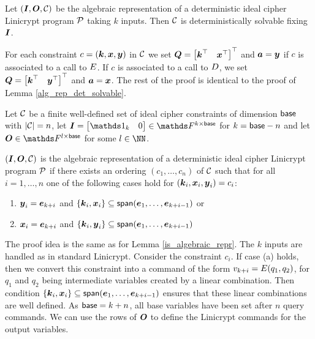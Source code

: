 \begin{lemma}
\label{alg_rep_det_solvable_ic}
    Let $(\I, \O, \C)$ be the algebraic representation of a deterministic ideal cipher Linicrypt program $\P$ taking $k$ inputs.
    Then $\C$ is deterministically solvable fixing $\I$.
\end{lemma}

\begin{sketch}
    For each constraint $c = (\vk, \vx, \vy)$ in $\C$ we set $\Q = \m{\vk^\top & \vx^\top}^\top$ and $\va = \vy$ if $c$ is associated to a call to $\E$.
    If $c$ is associated to a call to $\D$,
    we set $\Q = \m{\vk^\top & \vy^\top}^\top$ and $\va = \vx$.
    The rest of the proof is identical to the proof of Lemma \ref{alg_rep_det_solvable}.
\end{sketch}

\begin{lemma}
\label{is_algebraic_repr_ic}
    Let $\C$ be a finite well-defined set of ideal cipher constraints of dimension $\base$ with $|\C| = n$,
    let $\I = \m{\Id_k & 0} \in \F^{k\times\base}$ for $k = \base - n$
    and let $\O \in \F^{l \times \base}$ for some $l \in \NN$.
       
    $(\I, \O, \C)$ is the algebraic representation of a deterministic ideal cipher Linicrypt program $\P$
    if there exists an ordering $(c_1, \dots, c_n)$ of $\C$
    such that for all $i=1, \dots, n$ one of the following cases hold for $(\vk_i, \vx_i, \vy_i) = c_i$:
    \begin{enumerate}[label=(\alph*)]
    \item
    $\vy_i = \ve_{k+i}$ and $\{\vk_i, \vx_i\} \subseteq \spn(\dts \ve {k+i-1})$ or
    \item
    $\vx_i = \ve_{k+i}$ and $\{\vk_i, \vy_i\} \subseteq \spn(\dts \ve {k+i-1})$
    \end{enumerate}
\end{lemma}

\begin{sketch}
    The proof idea is the same as for Lemma \ref{is_algebraic_repr}.
    The $k$ inputs are handled as in standard Linicrypt.
    Consider the constraint $c_i$.
    If case (a) holds, then we convert this constraint into a command of the form $v_{k+i} = \E(q_1, q_2)$,
    for $q_1$ and $q_2$ being intermediate variables created by a linear combination.
    Then condition $\{\vk_i, \vx_i\} \subseteq \spn(\dts \ve {k+i-1})$ ensures that these linear combinations are well defined.
    As $\base = k + n$, all base variables have been set after $n$ query commands.
    We can use the rows of $\O$ to define the Linicrypt commands for the output variables.
\end{sketch}

